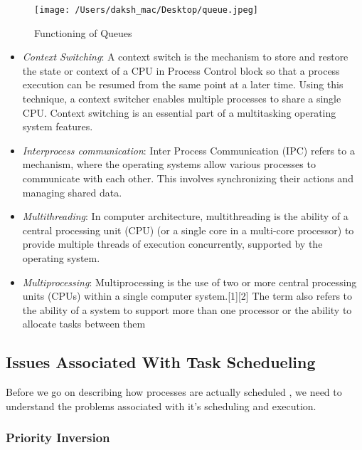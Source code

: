 \documentclass[12pt]{article}
\begin{document}
\begin{figure}[H]
	\centering
	\texttt{[image: /Users/daksh\_mac/Desktop/queue.jpeg]}
	\caption[About queues]{Functioning of Queues}
	\label{fig:queue}	
\end{figure}

\begin{itemize}
	\item \emph{Context Switching}: A context switch is the mechanism to store and restore the state or context of a CPU in Process Control block so that a process execution can be resumed from the same point at a later time. Using this technique, a context switcher enables multiple processes to share a single CPU. Context switching is an essential part of a multitasking operating system features.
	
	
	\item \emph{Interprocess communication}: Inter Process Communication (IPC) refers to a mechanism, where the operating systems allow various processes to communicate with each other. This involves synchronizing their actions and managing shared data.
	
	\item \emph{Multithreading}: In computer architecture, multithreading is the ability of a central processing unit (CPU) (or a single core in a multi-core processor) to provide multiple threads of execution concurrently, supported by the operating system.
	
	\item \emph{Multiprocessing}: Multiprocessing is the use of two or more central processing units (CPUs) within a single computer system.[1][2] The term also refers to the ability of a system to support more than one processor or the ability to allocate tasks between them
	
\end{itemize}

\cleardoublepage

\subsection{Issues Associated With Task Schedueling }

Before we go on describing how processes are actually scheduled , we need to understand the problems associated with it's scheduling and execution.

\subsubsection{Priority Inversion}
\end{document}
